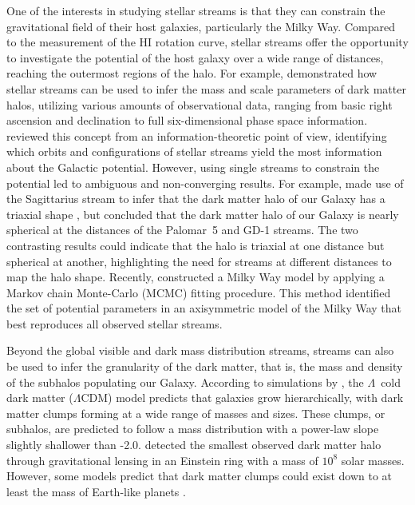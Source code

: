     One of the interests in studying stellar streams is that they can constrain the gravitational field of their host galaxies, particularly the Milky Way. Compared to the measurement of the HI rotation curve, stellar streams offer the opportunity to investigate the potential of the host galaxy over a wide range of distances, reaching the outermost regions of the halo. For example, \citet{2011MNRAS.417..198V} demonstrated how stellar streams can be used to infer the mass and scale parameters of dark matter halos, utilizing various amounts of observational data, ranging from basic right ascension and declination to full six-dimensional phase space information. \citet{2018ApJ...867..101B} reviewed this concept from an information-theoretic point of view, identifying which orbits and configurations of stellar streams yield the most information about the Galactic potential. However, using single streams to constrain the potential led to ambiguous and non-converging results. For example, \citet{2010ApJ...718.1128L} made use of the Sagittarius stream to infer that the dark matter halo of our Galaxy has a triaxial shape \citep[see also][]{2004MNRAS.351..643H, 2005ApJ...619..800J, 2005ApJ...619..807L}, but \citet{2016ApJ...833...31B} concluded that the dark matter halo of our Galaxy is nearly spherical at the distances of the Palomar~5 and GD-1 streams. The two contrasting results could indicate that the halo is triaxial at one distance but spherical at another, highlighting the need for streams at different distances to map the halo shape. Recently, \citet{2024ApJ...967...89I} constructed a Milky Way model by applying a Markov chain Monte-Carlo (MCMC) fitting procedure. This method identified the set of potential parameters in an axisymmetric model of the Milky Way that best reproduces all observed stellar streams.

    Beyond the global visible and dark mass distribution streams, streams can also be used to infer the granularity of the dark matter, that is, the mass and density of the subhalos populating our Galaxy. According to simulations by \citet{2008MNRAS.391.1685S}, the $\Lambda$~cold dark matter ($\Lambda$CDM) model predicts that galaxies grow hierarchically, with dark matter clumps forming at a wide range of masses and sizes. These clumps, or subhalos, are predicted to follow a mass distribution with a power-law slope slightly shallower than -2.0. \citet{2012Natur.481..341V} detected the smallest observed dark matter halo through gravitational lensing in an Einstein ring with a mass of $10^8$ solar masses. However, some models predict that dark matter clumps could exist down to at least the mass of Earth-like planets \citep[see]{2005JCAP...08..003G, 2021arXiv211101148A}. 


